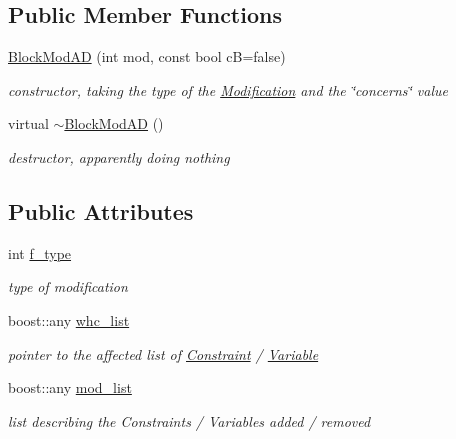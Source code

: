\subsection*{Public Member Functions}
\begin{DoxyCompactItemize}
\item 
\mbox{\hyperlink{class_s_m_spp__di__unipi__it_1_1_block_mod_a_d_a32b322f85e00e6548702c49cb8fc6fea}{Block\+Mod\+AD}} (int mod, const bool cB=false)
\begin{DoxyCompactList}\small\item\em constructor, taking the type of the \mbox{\hyperlink{class_s_m_spp__di__unipi__it_1_1_modification}{Modification}} and the \char`\"{}concerns\char`\"{} value \end{DoxyCompactList}\item 
virtual \mbox{\hyperlink{class_s_m_spp__di__unipi__it_1_1_block_mod_a_d_aaa3a21020e492301264144046ae407ba}{$\sim$\+Block\+Mod\+AD}} ()
\begin{DoxyCompactList}\small\item\em destructor, {\itshape apparently} doing nothing \end{DoxyCompactList}\end{DoxyCompactItemize}
\subsection*{Public Attributes}
\begin{DoxyCompactItemize}
\item 
\mbox{\label{class_s_m_spp__di__unipi__it_1_1_block_mod_a_d_a102e30a031044d9e821316a075e882b1}} 
int \mbox{\hyperlink{class_s_m_spp__di__unipi__it_1_1_block_mod_a_d_a102e30a031044d9e821316a075e882b1}{f\+\_\+type}}
\begin{DoxyCompactList}\small\item\em type of modification \end{DoxyCompactList}\item 
boost\+::any \mbox{\hyperlink{class_s_m_spp__di__unipi__it_1_1_block_mod_a_d_a2e044cee2bbf96e34295a5b568d609bb}{whc\+\_\+list}}
\begin{DoxyCompactList}\small\item\em pointer to the affected list of \mbox{\hyperlink{class_s_m_spp__di__unipi__it_1_1_constraint}{Constraint}} / \mbox{\hyperlink{class_s_m_spp__di__unipi__it_1_1_variable}{Variable}} \end{DoxyCompactList}\item 
boost\+::any \mbox{\hyperlink{class_s_m_spp__di__unipi__it_1_1_block_mod_a_d_af9bc92f775d5cfac36b1ab880f620127}{mod\+\_\+list}}
\begin{DoxyCompactList}\small\item\em list describing the Constraints / Variables added / removed \end{DoxyCompactList}\end{DoxyCompactItemize}
